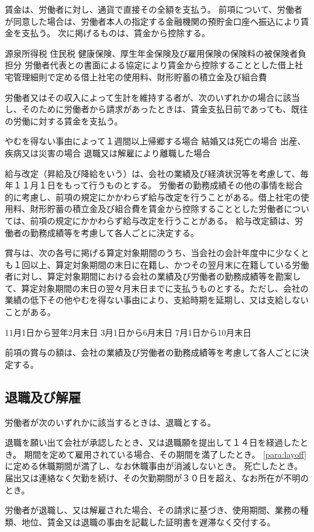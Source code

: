 \documentclass[10pt,a4paper,uplatex]{jsarticle}
\begin{document}
賃金は、労働者に対し、通貨で直接その全額を支払う。
\term
前項について、労働者が同意した場合は、労働者本人の指定する金融機関の預貯金口座へ振込により賃金を支払う。
\term
次に掲げるものは、賃金から控除する。
\begin{enumerate}
    \itm 源泉所得税
    \itm 住民税
    \itm 健康保険、厚生年金保険及び雇用保険の保険料の被保険者負担分
    \itm 労働者代表との書面による協定により賃金から控除することとした借上社宅管理細則で定める借上社宅の使用料、財形貯蓄の積立金及び組合費
\end{enumerate}

労働者又はその収入によって生計を維持する者が、次のいずれかの場合に該当し、そのために労働者から請求があったときは、賃金支払日前であっても、既往の労働に対する賃金を支払う。
\begin{enumerate}
    \itm やむを得ない事由によって１週間以上帰郷する場合
    \itm 結婚又は死亡の場合
    \itm 出産、疾病又は災害の場合
    \itm 退職又は解雇により離職した場合
\end{enumerate}

給与改定（昇給及び降給をいう）は、会社の業績及び経済状況等を考慮して、毎年１１月１日をもって行うものとする。
\term
労働者の勤務成績その他の事情を総合的に考慮し、前項の規定にかかわらず給与改定を行うことがある。借上社宅の使用料、財形貯蓄の積立金及び組合費を賃金から控除することとした労働者については、前項の規定にかかわらず給与改定を行うことがある。
\term
給与改定額は、労働者の勤務成績等を考慮して各人ごとに決定する。

賞与は、次の各号に掲げる算定対象期間のうち、当会社の会計年度中に少なくとも１回以上、算定対象期間の末日に在籍し、かつその翌月末に在籍している労働者に対し、算定対象期間における会社の業績及び労働者の勤務成績等を勘案して、算定対象期間の末日の翌々月末日までに支払うものとする。ただし、会社の業績の低下その他やむを得ない事由により、支給時期を延期し、又は支給しないことがある。
\begin{enumerate}
    \itm 11月1日から翌年2月末日
    \itm 3月1日から6月末日
    \itm 7月1日から10月末日 
\end{enumerate}
\term
前項の賞与の額は、会社の業績及び労働者の勤務成績等を考慮して各人ごとに決定する。


\subsection{退職及び解雇}

労働者が次のいずれかに該当するときは、退職とする。
\begin{enumerate}
    \itm 退職を願い出て会社が承認したとき、又は退職願を提出して１４日を経過したとき。
    \itm 期間を定めて雇用されている場合、その期間を満了したとき。
    \itm \ref{para:layoff}に定める休職期間が満了し、なお休職事由が消滅しないとき。
    \itm 死亡したとき。
    \itm 届出又は連絡なく欠勤を続け、その欠勤期間が３０日を超え、なお所在が不明のとき。
\end{enumerate}
\term
労働者が退職し、又は解雇された場合、その請求に基づき、使用期間、業務の種類、地位、賃金又は退職の事由を記載した証明書を遅滞なく交付する。
\end{document}
